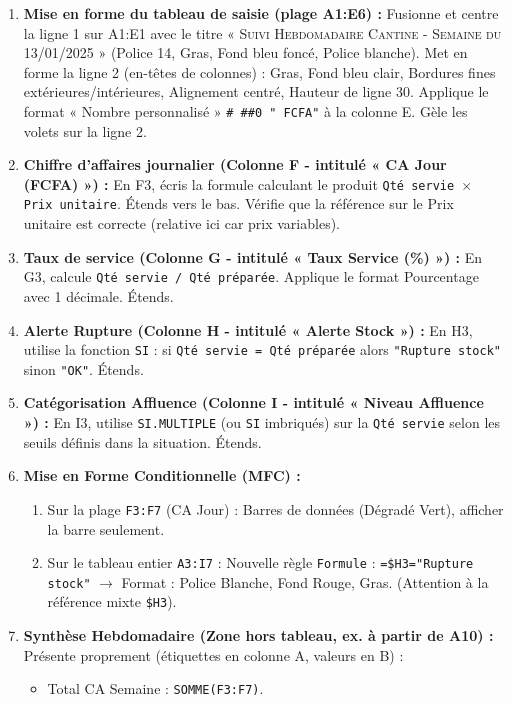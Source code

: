 \documentclass[11pt]{article}
\begin{document}
\begin{enumerate}
    \item \textbf{Mise en forme du tableau de saisie (plage A1:E6) :} Fusionne et centre la ligne 1 sur A1:E1 avec le titre « \textsc{Suivi Hebdomadaire Cantine - Semaine du 13/01/2025} » (Police 14, Gras, Fond bleu foncé, Police blanche). Met en forme la ligne 2 (en-têtes de colonnes) : Gras, Fond bleu clair, Bordures fines extérieures/intérieures, Alignement centré, Hauteur de ligne 30. Applique le format « Nombre personnalisé » \texttt{\# \#\#0 " FCFA"} à la colonne E. Gèle les volets sur la ligne 2.
    \item \textbf{Chiffre d'affaires journalier (Colonne F - intitulé « CA Jour (FCFA) ») :} En F3, écris la formule calculant le produit \texttt{Qté servie $\times$ Prix unitaire}. Étends vers le bas. Vérifie que la référence sur le Prix unitaire est correcte (relative ici car prix variables).
    \item \textbf{Taux de service (Colonne G - intitulé « Taux Service (\%) ») :} En G3, calcule \texttt{Qté servie / Qté préparée}. Applique le format Pourcentage avec 1 décimale. Étends.
    \item \textbf{Alerte Rupture (Colonne H - intitulé « Alerte Stock ») :} En H3, utilise la fonction \texttt{SI} : si \texttt{Qté servie = Qté préparée} alors \texttt{"Rupture stock"} sinon \texttt{"OK"}. Étends.
    \item \textbf{Catégorisation Affluence (Colonne I - intitulé « Niveau Affluence ») :} En I3, utilise \texttt{SI.MULTIPLE} (ou \texttt{SI} imbriqués) sur la \texttt{Qté servie} selon les seuils définis dans la situation. Étends.
    \item \textbf{Mise en Forme Conditionnelle (MFC) :}
    \begin{enumerate}
        \item Sur la plage \texttt{F3:F7} (CA Jour) : Barres de données (Dégradé Vert), afficher la barre seulement.
        \item Sur le tableau entier \texttt{A3:I7} : Nouvelle règle \texttt{Formule} : \texttt{=\$H3="Rupture stock"} $\rightarrow$ Format : Police Blanche, Fond Rouge, Gras. (Attention à la référence mixte \texttt{\$H3}).
    \end{enumerate}
    \item \textbf{Synthèse Hebdomadaire (Zone hors tableau, ex. à partir de A10) :} Présente proprement (étiquettes en colonne A, valeurs en B) :
    \begin{itemize}
        \item Total CA Semaine : \texttt{SOMME(F3:F7)}.

\end{itemize}
\end{enumerate}
\end{document}
